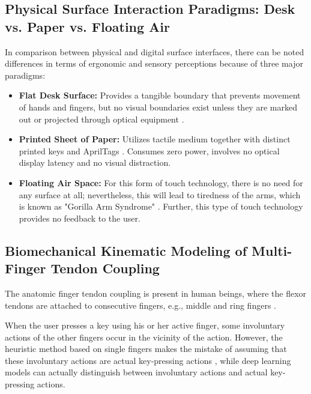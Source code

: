 \subsection{Physical Surface Interaction Paradigms: Desk vs. Paper vs. Floating Air}
\label{subsec:lit_surface_paradigms}
In comparison between physical and digital surface interfaces, there can be noted differences in terms of ergonomic and sensory perceptions because of three major paradigms:
\begin{itemize}
    \item \textbf{Flat Desk Surface:} Provides a tangible boundary that prevents movement of hands and fingers, but no visual boundaries exist unless they are marked out or projected through optical equipment \cite{Srivastava2012RealTime}.
    \item \textbf{Printed Sheet of Paper:} Utilizes tactile medium together with distinct printed keys and AprilTags \cite{Zhang2001Visual, Khare2019QWERTY}. Consumes zero power, involves no optical display latency and no visual distraction.
    \item \textbf{Floating Air Space:} For this form of touch technology, there is no need for any surface at all; nevertheless, this will lead to tiredness of the arms, which is known as "Gorilla Arm Syndrome" \cite{Boletsis2019TextInput, Enkhbat2020HandKey}. Further, this type of touch technology provides no feedback to the user.
\end{itemize}

\subsection{Biomechanical Kinematic Modeling of Multi-Finger Tendon Coupling}
\label{subsec:lit_biomechanical_coupling}
The anatomic finger tendon coupling is present in human beings, where the flexor tendons are attached to consecutive fingers, e.g., middle and ring fingers \cite{Simao2016Unsupervised, Pilkov2024Markerless}.

When the user presses a key using his or her active finger, some involuntary actions of the other fingers occur in the vicinity of the action. However, the heuristic method based on single fingers makes the mistake of assuming that these involuntary actions are actual key-pressing actions \cite{Thomas2013Camera, Srivastava2012RealTime}, while deep learning models can actually distinguish between involuntary actions and actual key-pressing actions.


